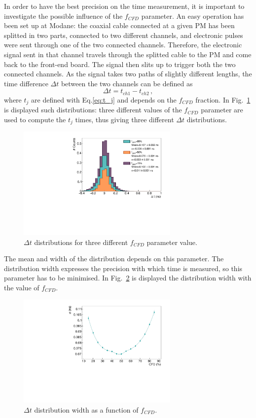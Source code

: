 In order to have the best precision on the time measurement, it is important to investigate the possible influence of the $f_{CFD}$ parameter.
An easy operation has been set up at Modane: the coaxial cable connected at a given PM has been splitted in two parts, connected to two different channels, and electronic pulses were sent through one of the two connected channels.
Therefore, the electronic signal sent in that channel travels through the splitted cable to the PM and come back to the front-end board.
The signal then slits up to trigger both the two connected channels.
As the signal takes two paths of slightly different lengths, the time difference $\Delta t$ between the two channels can be defined as
\begin{equation}
  \Delta t = t_{ch1}-t_{ch2}\,,
\end{equation}
where $t_{j}$ are defined with Eq.\eqref{eq:t_j} and depends on the $f_{CFD}$ fraction.
In Fig.~\ref{fig:deltat_CFD} is displayed such distributions: three different values of the $f_{CFD}$ parameter are used to compute the $t_{j}$ times, thus giving three different $\Delta t$ distributions.
\begin{figure}[h!]
  \centering
  \includegraphics[width=0.7\textwidth]{commissioning/fig_commissioning/deltat.pdf}
  \caption{$\Delta t$ distributions for three different $f_{CFD}$ parameter value.
    \label{fig:deltat_CFD}}
\end{figure}
The mean and width of the distribution depends on this parameter.
The distribution width expresses the precision with which time is measured, so this parameter has to be minimised.
In Fig.~\ref{fig:CFD_study} is displayed the distribution width with the value of $f_{CFD}$.
\begin{figure}[h!]
  \centering
  \includegraphics[width=0.7\textwidth]{commissioning/fig_commissioning/CFD_study.pdf}
  \caption{$\Delta t$ distribution width as a function of $f_{CFD}$.
    \label{fig:CFD_study}}
\end{figure}
